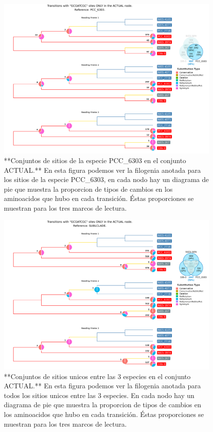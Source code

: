 \documentclass[
]{book}
\begin{document}
\begin{figure}

{\centering \includegraphics[width=1.2\linewidth]{Clados/Calothrix_B/figures/A/GCGATCGC/Actual/PCC_6303_Actual_A_tree} 

}

\caption{**Conjuntos de sitios de la especie PCC\_6303 en el conjunto ACTUAL.** En esta figura podemos ver la filogenia anotada para los sitios de la especie PCC\_6303, en cada nodo hay un diagrama de pie que muestra la proporcion de tipos de cambios en los aminoacidos que hubo en cada transición. Éstas proporciones se muestran para los tres marcos de lectura.}\label{fig:FIG11}
\end{figure}

\begin{figure}

{\centering \includegraphics[width=1.2\linewidth]{Clados/Calothrix_B/figures/A/GCGATCGC/Actual/SUBCLADE_Actual_A_tree} 

}

\caption{**Conjuntos de sitios unicos entre las 3 especies en el conjunto ACTUAL.** En esta figura podemos ver la filogenia anotada para todos los sitios unicos entre las 3 especies. En cada nodo hay un diagrama de pie que muestra la proporcion de tipos de cambios en los aminoacidos que hubo en cada transición. Éstas proporciones se muestran para los tres marcos de lectura.}\label{fig:FIG12}
\end{figure}
\end{document}
